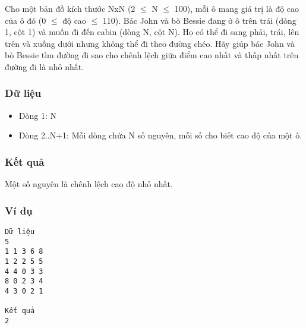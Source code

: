 



   Cho một bản đồ kích thước NxN (2  $\le$  N  $\le$  100), mỗi ô mang giá trị là độ cao của ô đó (0  $\le$  độ cao  $\le$  110). Bác John và bò Bessie đang ở ô trên trái (dòng 1, cột 1) và muốn đi đến cabin (dòng N, cột N). Họ có thể đi sang phải, trái, lên trên và xuống dưới nhưng không thể đi theo đường chéo. Hãy giúp bác John và bò Bessie tìm đường đi sao cho chênh lệch giữa điểm cao nhất và thấp nhất trên đường đi là nhỏ nhất.  

\subsubsection{   Dữ liệu  }
\begin{itemize}
	\item     Dòng 1: N   
	\item     Dòng 2..N+1: Mỗi dòng chứa N số nguyên, mỗi số cho biết cao độ của một ô.   
\end{itemize}

\subsubsection{   Kết quả  }

   Một số nguyên là chênh lệch cao độ nhỏ nhất.  

\subsubsection{   Ví dụ  }
\begin{verbatim}
Dữ liệu
5
1 1 3 6 8
1 2 2 5 5
4 4 0 3 3
8 0 2 3 4
4 3 0 2 1

Kết quả
2
\end{verbatim}
